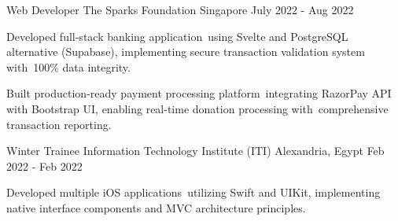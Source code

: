 \begin{cventries}
    
    \cventry
    {Web Developer} %
    {The Sparks Foundation} %
    {Singapore} %
    {July 2022 - Aug 2022} %
    {
      \begin{cvitems} %
        \item {Developed full-stack banking application using Svelte and PostgreSQL alternative (Supabase), implementing secure transaction validation system with 100\% data integrity.}
        \item {Built production-ready payment processing platform integrating RazorPay API with Bootstrap UI, enabling real-time donation processing with comprehensive transaction reporting.}
      \end{cvitems}
    }
    
   

    \cventry
    {Winter Trainee} %
    {Information Technology Institute (ITI)} %
    {Alexandria, Egypt} %
    {Feb 2022 - Feb 2022} %
    {
      \begin{cvitems} %
        \item {Developed multiple iOS applications utilizing Swift and UIKit, implementing native interface components and MVC architecture principles.}
      \end{cvitems}
    }
    
   
\end{cventries}
